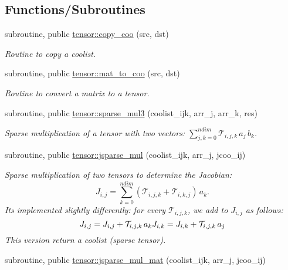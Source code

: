 \subsection*{Functions/\+Subroutines}
\begin{DoxyCompactItemize}
\item 
subroutine, public \hyperlink{namespacetensor_a14f95c256cdf137ca0767ddb3c87deea}{tensor\+::copy\+\_\+coo} (src, dst)
\begin{DoxyCompactList}\small\item\em Routine to copy a coolist. \end{DoxyCompactList}\item 
subroutine, public \hyperlink{namespacetensor_a75d1a9ca8b39e9ad4b151a7b4b45c70f}{tensor\+::mat\+\_\+to\+\_\+coo} (src, dst)
\begin{DoxyCompactList}\small\item\em Routine to convert a matrix to a tensor. \end{DoxyCompactList}\item 
subroutine, public \hyperlink{namespacetensor_a11054027a386918658f8948231af53b1}{tensor\+::sparse\+\_\+mul3} (coolist\+\_\+ijk, arr\+\_\+j, arr\+\_\+k, res)
\begin{DoxyCompactList}\small\item\em Sparse multiplication of a tensor with two vectors\+: ${\displaystyle \sum_{j,k=0}^{ndim}} \mathcal{T}_{i,j,k} \, a_j \,b_k$. \end{DoxyCompactList}\item 
subroutine, public \hyperlink{namespacetensor_add2a6aa993cd8a23be60d1643b5c7942}{tensor\+::jsparse\+\_\+mul} (coolist\+\_\+ijk, arr\+\_\+j, jcoo\+\_\+ij)
\begin{DoxyCompactList}\small\item\em Sparse multiplication of two tensors to determine the Jacobian\+: \[J_{i,j} = {\displaystyle \sum_{k=0}^{ndim}} \left( \mathcal{T}_{i,j,k} + \mathcal{T}_{i,k,j} \right) \, a_k.\] It\textquotesingle{}s implemented slightly differently\+: for every $\mathcal{T}_{i,j,k}$, we add to $J_{i,j}$ as follows\+: \[J_{i,j} = J_{i,j} + \mathcal{T}_{i,j,k} \, a_k \\ J_{i,k} = J_{i,k} + \mathcal{T}_{i,j,k} \, a_j\] This version return a coolist (sparse tensor). \end{DoxyCompactList}\item 
subroutine, public \hyperlink{namespacetensor_a4135cf70df5030070922ff199c79cc03}{tensor\+::jsparse\+\_\+mul\+\_\+mat} (coolist\+\_\+ijk, arr\+\_\+j, jcoo\+\_\+ij)

\end{DoxyCompactItemize}
